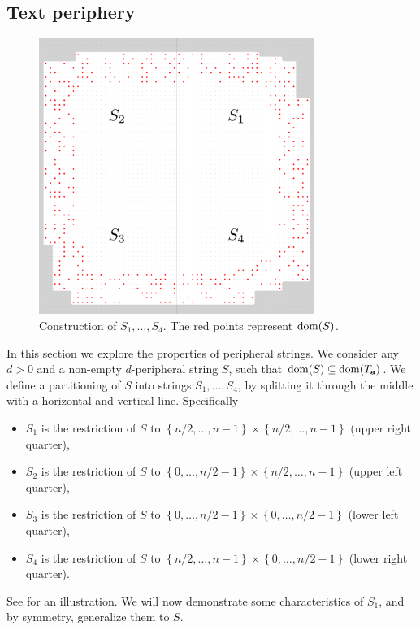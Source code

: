 \documentclass[11pt, letterpaper]{article}
\theoremstyle{plain}
\theoremstyle{definition}
\theoremstyle{remark}
\newcommand{\set}[1]{\left\lbrace #1 \right\rbrace}
\begin{document}
\subsection{Text periphery}\label{periphery_section}
\begin{figure}[!t]
	\begin{center}
		\includegraphics[width=0.8\textwidth]{drawings/quarter_split}
	\end{center}
	\caption{Construction of $S_1, \dots, S_4$. The red points represent $\operatorname*{dom}(S)$.}
	\label{figure:quarter_split}
\end{figure}
In this section we explore the properties of peripheral strings.
We consider any $d > 0$ and a non-empty $d$-peripheral string $S$, such that $\operatorname*{dom}(S) \subseteq \operatorname*{dom}(T_\mathbf{a})$.
We define a partitioning of $S$ into strings $S_1, \dots, S_4$, by splitting it through the middle with a horizontal and vertical line. 
Specifically
\begin{itemize}
	\item $S_1$ is the restriction of $S$ to $\set{n / 2, \dots, n - 1} \times \set{n / 2, \dots, n - 1}$ (upper right quarter),
	\item $S_2$ is the restriction of $S$ to $\set{0, \dots, n / 2 - 1} \times \set{n / 2, \dots, n - 1}$ (upper left quarter),
	\item $S_3$ is the restriction of $S$ to $\set{0, \dots, n / 2 - 1} \times \set{0, \dots, n / 2 - 1}$ (lower left quarter),
	\item $S_4$ is the restriction of $S$ to $\set{n / 2, \dots, n - 1} \times \set{0, \dots, n / 2 - 1}$ (lower right quarter).
\end{itemize}
See  for an illustration.
We will now demonstrate some characteristics of $S_1$, and by symmetry, generalize them to $S$.
\end{document}

